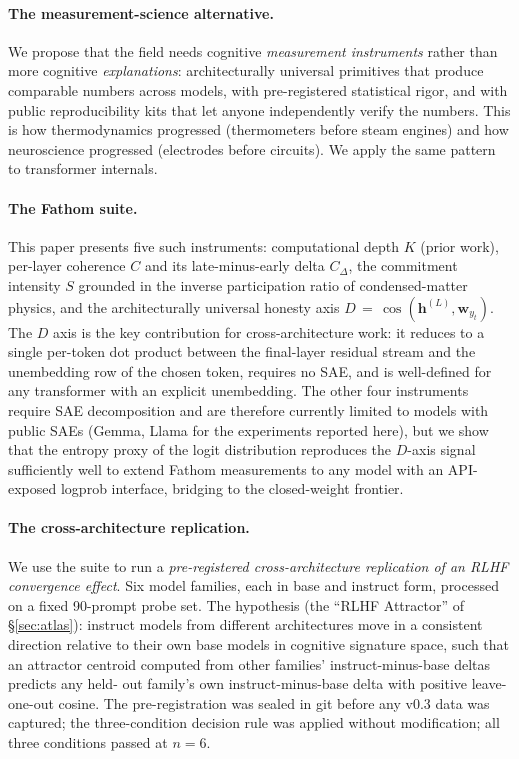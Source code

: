 \documentclass[11pt,letterpaper]{article}
\begin{document}
\paragraph{The measurement-science alternative.} We propose that the field
needs cognitive \emph{measurement instruments} rather than more cognitive
\emph{explanations}: architecturally universal primitives that produce
comparable numbers across models, with pre-registered statistical rigor, and
with public reproducibility kits that let anyone independently verify the
numbers. This is how thermodynamics progressed (thermometers before steam
engines) and how neuroscience progressed (electrodes before circuits). We
apply the same pattern to transformer internals.

\paragraph{The Fathom suite.} This paper presents five such instruments:
computational depth $K$ (prior work), per-layer coherence $C$ and its
late-minus-early delta $C_\Delta$, the commitment intensity $S$ grounded in
the inverse participation ratio of condensed-matter physics, and the
architecturally universal honesty axis
$D\,=\,\cos(\mathbf{h}^{(L)},\mathbf{w}_{y_t})$. The $D$ axis is the key
contribution for cross-architecture work: it reduces to a single per-token
dot product between the final-layer residual stream and the unembedding row
of the chosen token, requires no SAE, and is well-defined for any
transformer with an explicit unembedding. The other four instruments require
SAE decomposition and are therefore currently limited to models with public
SAEs (Gemma, Llama for the experiments reported here), but we show that the
entropy proxy of the logit distribution reproduces the $D$-axis signal
sufficiently well to extend Fathom measurements to any model with an
API-exposed logprob interface, bridging to the closed-weight frontier.

\paragraph{The cross-architecture replication.} We use the suite to run a
\emph{pre-registered cross-architecture replication of an RLHF
convergence effect}. Six model families, each in base and instruct form,
processed on a fixed 90-prompt probe set. The hypothesis (the ``RLHF
Attractor'' of \S\ref{sec:atlas}): instruct models from different
architectures move in a consistent direction relative to their own base
models in cognitive signature space, such that an attractor centroid
computed from other families' instruct-minus-base deltas predicts any held-
out family's own instruct-minus-base delta with positive leave-one-out
cosine. The pre-registration was sealed in git before any v0.3 data was
captured; the three-condition decision rule was applied without
modification; all three conditions passed at $n\!=\!6$.
\end{document}
